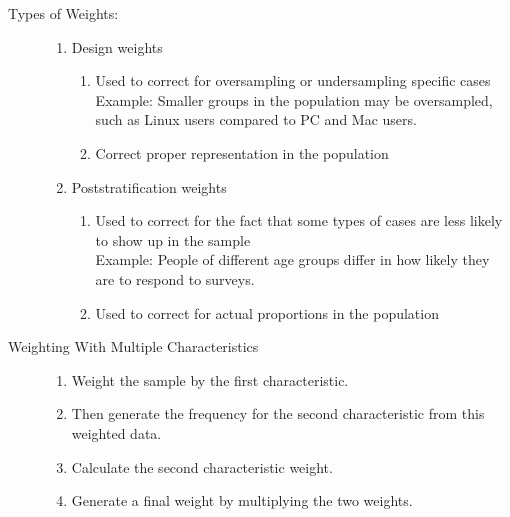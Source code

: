 \documentclass[10pt,landscape]{article}
\begin{document}
\begin{multicols}{3}
\begin{description}
\item[Types of Weights:] \quad
\begin{enumerate}
  \item Design weights
  \begin{enumerate}
    \item Used to correct for oversampling or undersampling specific cases\\
        Example: Smaller groups in the population may be oversampled, such as Linux users compared to PC and Mac users.
    \item Correct proper representation in the population
  \end{enumerate}
  \item Poststratification weights
  \begin{enumerate}
    \item Used to correct for the fact that some types of cases are less likely to show up in the sample\\
      Example: People of different age groups differ in how likely they are to respond to surveys.
    \item Used to correct for actual proportions in the population
  \end{enumerate}
\end{enumerate}

\item[Weighting With Multiple Characteristics] \quad
\begin{enumerate}
  \item Weight the sample by the first characteristic.
  \item Then generate the frequency for the second characteristic from this weighted data.
  \item Calculate the second characteristic weight.
  \item Generate a final weight by multiplying the two weights.
\end{enumerate}


\end{description}
\end{multicols}
\end{document}
